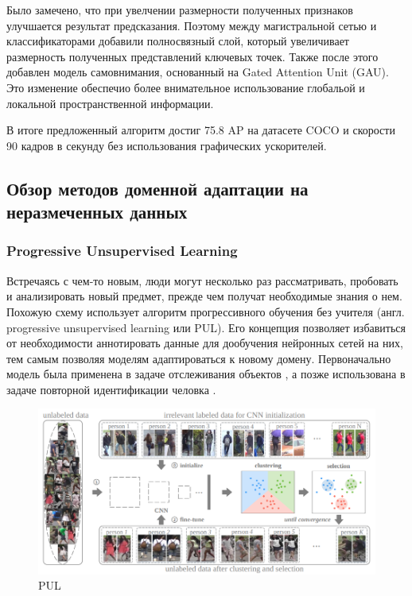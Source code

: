 Было замечено, что при увелчении размерности полученных признаков улучшается результат предсказания. Поэтому между магистральной сетью и классификаторами добавили полносвязный слой, который увеличивает размерность полученных представлений ключевых точек. Также после этого добавлен модель самовнимания, основанный на Gated Attention Unit
(GAU). Это изменение обеспечио более внимательное использование глобальой и локальной пространственной информации.

В итоге предложенный алгоритм достиг 75.8 AP на датасете COCO и скорости 90 кадров в секунду без использования графических ускорителей.


\subsection{Обзор методов доменной адаптации на неразмеченных данных}
\label{sec:Chapter4_DA}


\subsubsection*{Progressive Unsupervised Learning}

Встречаясь с чем-то новым, люди могут несколько раз рассматривать, пробовать и анализировать новый предмет, прежде чем получат необходимые знания о нем. Похожую схему использует алгоритм прогрессивного обучения без учителя (англ. progressive unsupervised learning или PUL). Его концепция позволяет избавиться от необходимости аннотировать данные для дообучения нейронных сетей на них, тем самым позволяя моделям адаптироваться к новому домену. Первоначально модель была применена в задаче отслеживания объектов \cite{pul}, а позже использована в задаче повторной идентификации человка \cite{pul_person}.

\begin{figure}[h]
	\centering
	\includegraphics[width=.8\textwidth]{./images/pul}
	\caption{PUL \cite{pul_person}}
	\label{fig:pul}
\end{figure}

